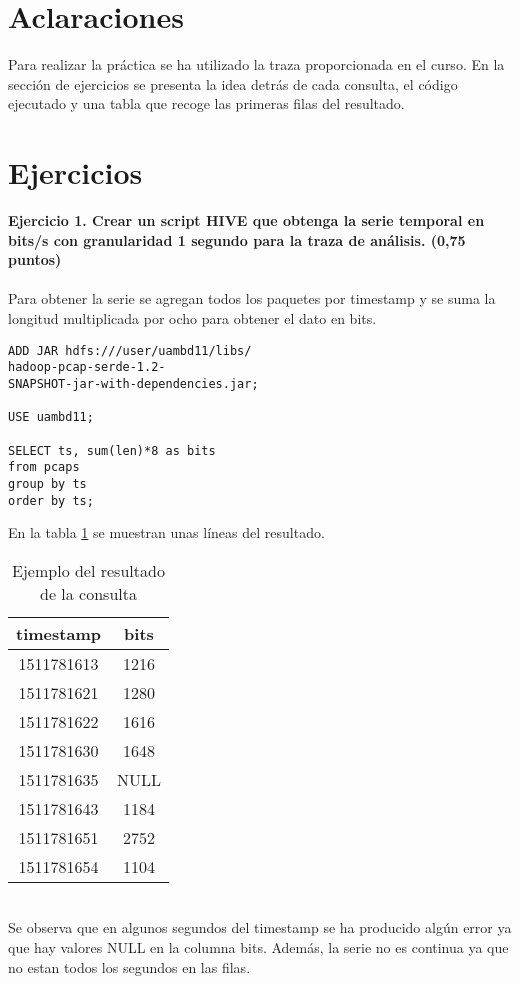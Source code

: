 \section*{Aclaraciones}
Para realizar la práctica se ha utilizado la traza proporcionada en el curso. En la sección de ejercicios se presenta la idea detrás de cada consulta, el código ejecutado y una tabla que recoge las primeras filas del resultado.
\section*{Ejercicios}
\textbf{Ejercicio 1. Crear un script HIVE que obtenga la serie temporal en bits/s con granularidad 1 segundo para la traza de análisis. (0,75 puntos)}\\\\
Para obtener la serie se agregan todos los paquetes por timestamp y se suma la longitud multiplicada por ocho para obtener el dato en bits.
\begin{lstlisting}[caption=Consulta para obtener la serie]
ADD JAR hdfs:///user/uambd11/libs/
hadoop-pcap-serde-1.2-
SNAPSHOT-jar-with-dependencies.jar;

USE uambd11;

SELECT ts, sum(len)*8 as bits
from pcaps 
group by ts 
order by ts;
\end{lstlisting}
En la tabla \ref{tab:c1} se muestran unas líneas del resultado.
\begin{table}[ht]
	\centering
	\caption{Ejemplo del resultado de la consulta}
	\begin{tabular}[t]{cc}
		timestamp & bits \\
		\hline
		1511781613 & 1216 \\
		1511781621 & 1280 \\
		1511781622 & 1616 \\
		1511781630 &1648 \\
		1511781635 & NULL \\
		1511781643 & 1184 \\
		1511781651 & 2752 \\
		1511781654 & 1104 \\
	\end{tabular}
	\label{tab:c1}
\end{table}%
\\
Se observa que en algunos segundos del timestamp se ha producido algún error ya que hay valores NULL en la columna bits. Además, la serie no es continua ya que no estan todos los segundos en las filas. \\\\
